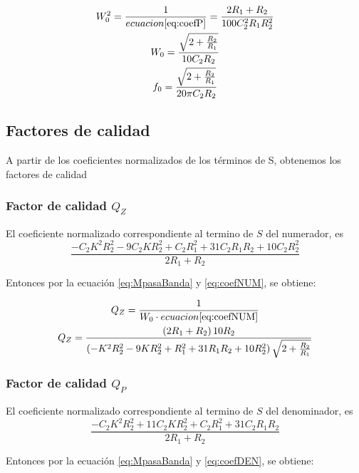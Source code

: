 \documentclass[../../tc_tp3_main.tex]{subfiles}
\begin{document}
\begin{gather}
W_0^2=\frac{1}{ecuacion \ref{eq:coefP}}=\frac{2R_1+R_2}{100 C_{2}^2 R_{1} R_{2} ^2}   \\
W_0=\frac{\sqrt{2+\frac{R_2}{R_1}}}{10C_2 R_2}\\
f_0=\frac{\sqrt{2+\frac{R_2}{R_1}}}{20 \pi C_2 R_2} \label{eq:MfrecCen}
\end{gather}
\subsection{Factores de calidad}
A partir de los coeficientes normalizados de los términos de S, obtenemos los factores de calidad




\subsubsection{Factor de calidad $Q_Z$}
El coeficiente normalizado correspondiente al termino de $S$ del numerador, es
\begin{equation}
\frac{-C_2 K ^2 R_2^2 - 9  C_2 K R_2 ^2 + C_2 R_1^2 +31 C_2 R_1 R_2+10 C_2 R_2^2}{2R_1 +R_2} \label{eq:coefNUM}
\end{equation}


Entonces por la ecuación \ref{eq:MpasaBanda} y \ref{eq:coefNUM}, se obtiene:

\begin{gather}
Q_Z=\frac{1}{W_0 \cdot ecuacion\ref{eq:coefNUM}}\\
Q_Z=\frac{\left( 2R_1 +R_2 \right) 10 R_2 }{\left( - K ^2 R_2^2 - 9   K R_2 ^2 +  R_1^2 +31  R_1 R_2+10  R_2^2 \right)\sqrt{2+\frac{R_2}{R_1}} }
\end{gather}







\subsubsection{Factor de calidad $Q_P$}
El coeficiente normalizado correspondiente al termino de $S$ del denominador, es
\begin{equation}
\frac{-C_2 K ^2 R_2^2 + 11  C_2 K R_2 ^2 + C_2 R_1^2 +31 C_2 R_1 R_2}{2R_1 +R_2} \label{eq:coefDEN}
\end{equation}


Entonces por la ecuación \ref{eq:MpasaBanda} y \ref{eq:coefDEN}, se obtiene:
\end{document}
